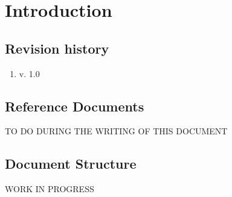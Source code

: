 \documentclass[../rasd.tex]{subfiles}
\begin{document}
\chapter{Introduction}
		
		
		
		
		
	
		\section{Revision history}
		\begin{enumerate}
			\item v. 1.0
		\end{enumerate}
		\section{Reference Documents}
		TO DO DURING THE WRITING OF THIS DOCUMENT
		\section{Document Structure}
		WORK IN PROGRESS
		
\end{document}
